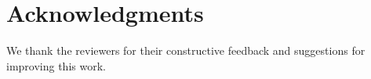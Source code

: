 \section*{Acknowledgments}
We thank the reviewers for their constructive feedback and suggestions for improving this work.
